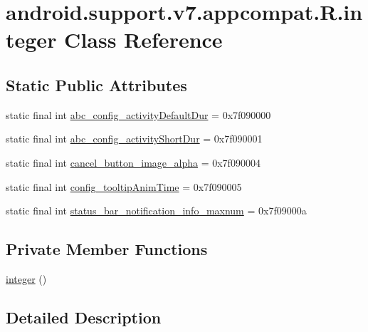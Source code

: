 \hypertarget{classandroid_1_1support_1_1v7_1_1appcompat_1_1_r_1_1integer}{}\section{android.\+support.\+v7.\+appcompat.\+R.\+integer Class Reference}
\label{classandroid_1_1support_1_1v7_1_1appcompat_1_1_r_1_1integer}
\subsection*{Static Public Attributes}
\begin{DoxyCompactItemize}
\item 
static final int \mbox{\hyperlink{classandroid_1_1support_1_1v7_1_1appcompat_1_1_r_1_1integer_a4fb2e7826a35c40f397f9f14b86a0c7d}{abc\+\_\+config\+\_\+activity\+Default\+Dur}} = 0x7f090000
\item 
static final int \mbox{\hyperlink{classandroid_1_1support_1_1v7_1_1appcompat_1_1_r_1_1integer_a6687bb8055a5a731b1429884734c9565}{abc\+\_\+config\+\_\+activity\+Short\+Dur}} = 0x7f090001
\item 
static final int \mbox{\hyperlink{classandroid_1_1support_1_1v7_1_1appcompat_1_1_r_1_1integer_a21ede1655715ffc1421fbd057706bfa8}{cancel\+\_\+button\+\_\+image\+\_\+alpha}} = 0x7f090004
\item 
static final int \mbox{\hyperlink{classandroid_1_1support_1_1v7_1_1appcompat_1_1_r_1_1integer_a50de93cd4384999ae960f3cf2f8decb9}{config\+\_\+tooltip\+Anim\+Time}} = 0x7f090005
\item 
static final int \mbox{\hyperlink{classandroid_1_1support_1_1v7_1_1appcompat_1_1_r_1_1integer_a52a3923b3d9ba3b58e218794b30683dc}{status\+\_\+bar\+\_\+notification\+\_\+info\+\_\+maxnum}} = 0x7f09000a
\end{DoxyCompactItemize}
\subsection*{Private Member Functions}
\begin{DoxyCompactItemize}
\item 
\mbox{\hyperlink{classandroid_1_1support_1_1v7_1_1appcompat_1_1_r_1_1integer_a4b0c5e6fd8f34e481d9da11e93d1dc1e}{integer}} ()
\end{DoxyCompactItemize}


\subsection{Detailed Description}


